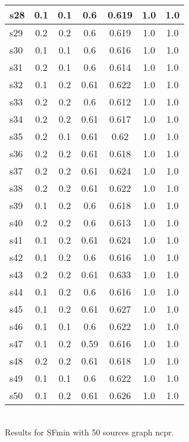 \documentclass{article}
\begin{document}
\begin{tabular}{|l|c|c|c|c|c|c|}
\hline
s28 &0.1 & 0.1 & 0.6 & 0.619 & 1.0 & 1.0\\
\hline
s29 &0.2 & 0.2 & 0.6 & 0.619 & 1.0 & 1.0\\
\hline
s30 &0.1 & 0.1 & 0.6 & 0.616 & 1.0 & 1.0\\
\hline
s31 &0.2 & 0.1 & 0.6 & 0.614 & 1.0 & 1.0\\
\hline
s32 &0.1 & 0.2 & 0.61 & 0.622 & 1.0 & 1.0\\
\hline
s33 &0.2 & 0.2 & 0.6 & 0.612 & 1.0 & 1.0\\
\hline
s34 &0.2 & 0.2 & 0.61 & 0.617 & 1.0 & 1.0\\
\hline
s35 &0.2 & 0.1 & 0.61 & 0.62 & 1.0 & 1.0\\
\hline
s36 &0.2 & 0.2 & 0.61 & 0.618 & 1.0 & 1.0\\
\hline
s37 &0.2 & 0.2 & 0.61 & 0.624 & 1.0 & 1.0\\
\hline
s38 &0.2 & 0.2 & 0.61 & 0.622 & 1.0 & 1.0\\
\hline
s39 &0.1 & 0.2 & 0.6 & 0.618 & 1.0 & 1.0\\
\hline
s40 &0.2 & 0.2 & 0.6 & 0.613 & 1.0 & 1.0\\
\hline
s41 &0.1 & 0.2 & 0.61 & 0.624 & 1.0 & 1.0\\
\hline
s42 &0.1 & 0.2 & 0.6 & 0.616 & 1.0 & 1.0\\
\hline
s43 &0.2 & 0.2 & 0.61 & 0.633 & 1.0 & 1.0\\
\hline
s44 &0.1 & 0.2 & 0.6 & 0.616 & 1.0 & 1.0\\
\hline
s45 &0.1 & 0.2 & 0.61 & 0.627 & 1.0 & 1.0\\
\hline
s46 &0.1 & 0.1 & 0.6 & 0.622 & 1.0 & 1.0\\
\hline
s47 &0.1 & 0.2 & 0.59 & 0.616 & 1.0 & 1.0\\
\hline
s48 &0.2 & 0.2 & 0.61 & 0.618 & 1.0 & 1.0\\
\hline
s49 &0.1 & 0.1 & 0.6 & 0.622 & 1.0 & 1.0\\
\hline
s50 &0.1 & 0.2 & 0.61 & 0.626 & 1.0 & 1.0\\
\hline
\end{tabular}\\

\noindent Results for SFmin with 50 sources graph ncpr.
\end{document}
